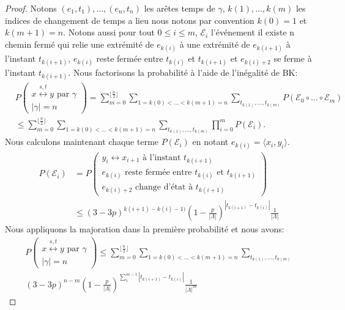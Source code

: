 \documentclass[titlepage,a4paper,12pt]{article}
\newcounter{d}
\newcounter{t}
\newcounter{p}
\newcounter{c}
\newcounter{a}
\newcounter{l}
\begin{document}
\begin{proof}
Notons $(e_1,t_1),\dots,(e_n,t_n)$ les arêtes temps de $\gamma$, $k(1),\dots,k(m)$ les indices de changement de temps a lieu nous notons par convention $k(0) = 1$ et $k(m+1)=n$. Notons aussi pour tout $0\leqslant i \leqslant m$, $\mathcal{E}_i$ l'événement il existe n chemin fermé qui relie une extrémité de $e_{k(i)}$ à une extrémité de $e_{k(i+1)}$ à l'instant $t_{k(i+1)}$, $e_{k(i)}$ reste fermée entre $t_{k(i)}$ et $t_{k(i+1)}$ et $e_{k(i)+2}$ se ferme à l'instant $t_{k(i+1)}$. Nous factorisons la probabilité à l'aide de l'inégalité de BK:
\begin{align*}
&P\left(\begin{array}{c}
x\overset{s,t}{\longleftrightarrow} y \text{ par }\gamma\\
|\gamma| = n
\end{array}\right)= \sum_{m=0}^{\lfloor\frac{n}{2}\rfloor}\sum_{1=k(0)<\dots<k(m+1)=n}\sum_{t_{k(1)},\dots,t_{k(m)}}P(\mathcal{E}_0\circ\dots\circ \mathcal{E}_m)\\
&\leqslant \sum_{m=0}^{\lfloor\frac{n}{2}\rfloor}\sum_{1=k(0)<\dots<k(m+1)=n}\sum_{t_{k(1)},\dots,t_{k(m)}} \prod_{i=0}^mP(\mathcal{E}_i).
\end{align*}
Nous calculons maintenant chaque terme $P(\mathcal{E}_i)$ en notant $e_{k(i)}= \langle x_i,y_i\rangle$.
\begin{align*}
P(\mathcal{E}_i) &= P\left(\begin{array}{c}
y_i\longleftrightarrow x_{i+1}\text{ à l'instant }t_{k(i+1)}\\
e_{k(i)} \text{ reste fermée entre } t_{k(i)} \text{ et } t_{k(i+1)}\\
e_{k(i)+2} \text{ change d'état à }t_{k(i+1)}
\end{array}\right)\\
& \leqslant (3-3p)^{k(i+1)-k(i)-1)}(1-\frac{p}{|\Lambda|})^{|t_{k(i+1)}-t_{k(i)}|}\frac{1}{|\Lambda|}
\end{align*}
Nous appliquons la majoration dans la première probabilité et nous avons:
\begin{multline*}
P\left(\begin{array}{c}
x\overset{s,t}{\longleftrightarrow} y \text{ par }\gamma\\
|\gamma| = n
\end{array}\right) \leqslant \sum_{m=0}^{\lfloor\frac{n}{2}\rfloor}\sum_{1=k(0)<\dots<k(m+1)=n} \sum_{t_{k(1)},\dots,t_{k(m)}}\\(3-3p)^{n-m}(1-\frac{p}{|\Lambda|})^{\sum_i^{m-1}|t_{k(i+1)}-t_{k(i)}|}\frac{1}{|\Lambda|^m}

\end{multline*}
\end{proof}
\end{document}
